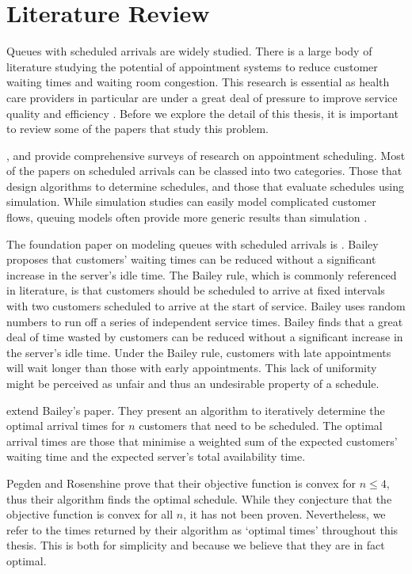 \chapter{Literature Review}
Queues with scheduled arrivals are widely studied. There is a large body of literature studying the potential of appointment systems to reduce customer waiting times and waiting room congestion. This research is essential as health care providers in particular are under a great deal of pressure to improve service quality and efficiency \citep{Goldsmith}.  Before we explore the detail of this thesis, it is important to review some of the papers that study this problem.

\citet{Fomundam}, and \citet{Cayirli} provide comprehensive surveys of research on appointment scheduling. Most of the papers on scheduled arrivals can be classed into two categories. Those that design algorithms to determine schedules, and those that evaluate schedules using simulation. While simulation studies can easily model complicated customer flows, queuing models often provide more generic results than simulation \citep{Green}.

The foundation paper on modeling queues with scheduled arrivals is \citet{Bailey}. Bailey proposes that customers' waiting times can be reduced without a significant increase in the server's idle time. The Bailey rule, which is commonly referenced in literature, is that customers should be scheduled to arrive at fixed intervals with two customers scheduled to arrive at the start of service. Bailey uses random numbers to run off a series of independent service times. Bailey finds that a great deal of time wasted by customers can be reduced without a significant increase in the server's idle time. Under the Bailey rule, customers with late appointments will wait longer than those with early appointments. This lack of uniformity might be perceived as unfair and thus an undesirable property of a schedule. 

\citet{Pegden} extend Bailey's paper. They present an algorithm to iteratively determine the optimal arrival times for $n$ customers that need to be scheduled. The optimal arrival times are those that minimise a weighted sum of the expected customers' waiting time and the expected server's total availability time.

Pegden and Rosenshine prove that their objective function is convex for $n \leq 4$, thus their algorithm finds the optimal schedule. While they conjecture that the objective function is convex for all $n$, it has not been proven. Nevertheless, we refer to the times returned by their algorithm as `optimal times' throughout this thesis. This is both for simplicity and because we believe that they are in fact optimal.

